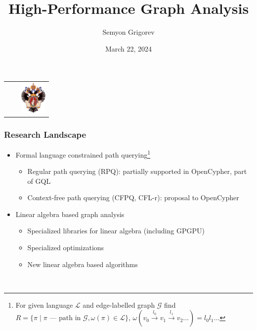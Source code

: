 \documentclass[xcolor=table,aspectratio=169]{beamer}
\title[High-performance graph analysis]{High-Performance Graph Analysis}
\institute[SPbSU]{
Saint Petersburg State University
}
\author[Semyon Grigorev]{Semyon Grigorev}
\date{March 22, 2024}
\begin{document}
{
\begin{frame}[fragile]
  \begin{table}
  \centering
  \begin{tabularx}{\linewidth}{XcX}
    \hfill
    & 
    & \hfill \includegraphics[height=1.6cm]{pictures/SPbGU_Logo.png}
  \end{tabularx}
  \end{table}
  \titlepage
\end{frame}
}

\begin{frame}[fragile]
  \frametitle{Research Landscape}
  \begin{minipage}{0.55\textwidth}
    \begin{itemize}
      \item Formal language constrained path querying\footnote{For given language $\mathcal{L}$ and edge-labelled graph $\mathcal{G}$ find $R=\{ \pi \mid \pi \text{ --- path in }\mathcal{G}, \omega(\pi) \in \mathcal{L}\}$,
      $\omega(v_0 \xrightarrow{l_0} v_1 \xrightarrow{l_1} v_2 \ldots) = l_0 l_1 \ldots$} 
      \begin{itemize}
        \item Regular path querying (RPQ): partially supported in OpenCypher, part of GQL
        \item Context-free path querying (CFPQ, CFL-r): proposal to OpenCypher
      \end{itemize} 
      \item Linear algebra based graph analysis
      \begin{itemize}
        \item Specialized libraries for linear algebra (including GPGPU)
        \item Specialized optimizations
        \item New linear algebra based algorithms
      \end{itemize}
    \end{itemize} 
  \end{minipage}~  
  \begin{minipage}{0.4\textwidth}

\end{minipage}
\end{frame}
\end{document}
